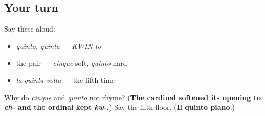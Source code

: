 \subsection*{Your turn}
Say these aloud:

\begin{itemize}
\raggedright
  \item \emph{quinto, quinta} — \emph{KWIN-to}
  \item the pair — \emph{cinque} soft, \emph{quinto} hard
  \item \emph{la quinta volta} — the fifth time
\end{itemize}

\begin{tcolorbox}[breakable,colback=teal!4,colframe=teal!35!black,title={Before you move on}]
Why do \emph{cinque} and \emph{quinto} not rhyme? (\textbf{The cardinal softened its opening to \emph{ch-} and the ordinal kept \emph{kw-}.}) Say the fifth floor. (\textbf{Il quinto piano}.)
\end{tcolorbox}
